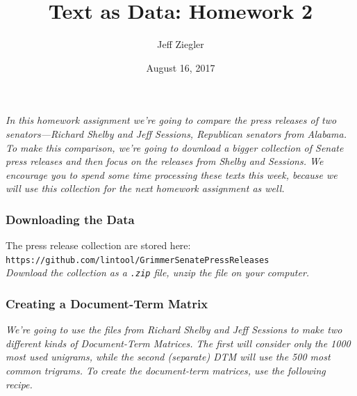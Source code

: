 \documentclass[12pt,letterpaper]{article}
\title{Text as Data: Homework 2}
\date{August 16, 2017}
\author{Jeff Ziegler}
\begin{document}
\maketitle

\noindent \textit{In this homework assignment we're going to compare the press releases of two senators---Richard Shelby and Jeff Sessions, Republican senators from Alabama.  To make this comparison, we're going to download a bigger collection of Senate press releases and then focus on the releases from Shelby and Sessions. We encourage you to spend some time processing these texts this week, because we will use this collection for the next homework assignment as well.}

\subsubsection*{Downloading the Data}

The press release collection are stored here:\\
{\tt https://github.com/lintool/GrimmerSenatePressReleases} \\

\noindent \textit{Download the collection as a {\tt .zip} file, unzip the file on your computer. } 

\subsubsection*{Creating a Document-Term Matrix}

\noindent \textit{We're going to use the files from Richard Shelby and Jeff Sessions to make two different kinds of Document-Term Matrices. The first will consider only the 1000 most used unigrams, while the second (separate) DTM will use the 500 most common trigrams. To create the document-term matrices, use the following recipe.}
\end{document}
